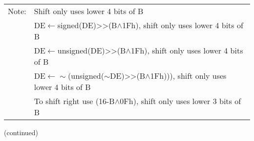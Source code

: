 \documentclass[oneside,a4paper]{book}
\newcommand{\notet}{\rule{0pt}{2.4ex}}
\newcommand{\noteb}{\rule[-1.3ex]{0pt}{0pt}}
\begin{document}
{\begin{tabular}{llcccccccccccccccl}
		\hline

		Note:
			& \multicolumn{17}{l}{\parbox{12cm}{\footnotemark[1] Shift only uses lower 4 bits of B}}\notet \\

			& \multicolumn{17}{l}{\parbox{12cm}{\footnotemark[2] DE$\leftarrow$signed(DE)>>(B$\wedge$1Fh), shift only uses lower 4 bits of B}} \\

			& \multicolumn{17}{l}{\parbox{12cm}{\footnotemark[3] DE$\leftarrow$unsigned(DE)>>(B$\wedge$1Fh), shift only uses lower 4 bits of B}} \\

			& \multicolumn{17}{l}{\parbox{12cm}{\footnotemark[4] DE$\leftarrow\sim$(unsigned($\sim$DE)>>(B$\wedge$1Fh))), shift only uses lower 4 bits of B}} \\

			& \multicolumn{17}{l}{\parbox{12cm}{\footnotemark[5] To shift right use (16-B$\wedge$0Fh), shift only uses lower 3 bits of B}}\noteb \\

		\hline

	\end{tabular}
}

(continued)\\
\end{document}
